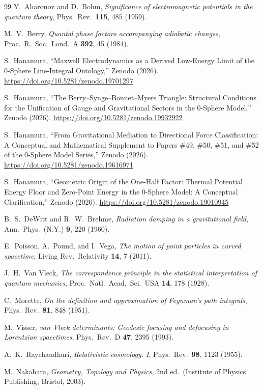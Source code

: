\documentclass[%
 reprint, amsmath,amssymb, aps, prb, ]{revtex4-2}
\numberwithin{equation}{section}
\begin{document}
\begin{thebibliography}{99}
 Y.~Aharonov and D.~Bohm, \textit{Significance of electromagnetic potentials in the quantum theory}, Phys.\ Rev.\ \textbf{115}, 485 (1959).

 M.~V.~Berry, \textit{Quantal phase factors accompanying adiabatic changes}, Proc.\ R.\ Soc.\ Lond.\ A \textbf{392}, 45 (1984).

S.~Hanamura,
``Maxwell Electrodynamics as a Derived Low-Energy Limit of the 0-Sphere Line-Integral Ontology,''
Zenodo (2026).
\href{https://doi.org/10.5281/zenodo.19701297}{https://doi.org/10.5281/zenodo.19701297}

S.~Hanamura,
``The Berry--Synge--Bonnet--Myers Triangle: Structural Conditions for the Unification of Gauge and Gravitational Sectors in the 0-Sphere Model,''
Zenodo (2026).
\href{https://doi.org/10.5281/zenodo.19932922}{https://doi.org/10.5281/zenodo.19932922}

S.~Hanamura,
``From Gravitational Mediation to Directional Force Classification: A Conceptual and Mathematical Supplement to Papers \#49, \#50, \#51, and \#52 of the 0-Sphere Model Series,''
Zenodo (2026).
\href{https://doi.org/10.5281/zenodo.19616971}{https://doi.org/10.5281/zenodo.19616971}

S.~Hanamura,
``Geometric Origin of the One-Half Factor: Thermal Potential Energy Floor and Zero-Point Energy in the 0-Sphere Model: A Conceptual Clarification,''
Zenodo (2026).
\href{https://doi.org/10.5281/zenodo.19010945}{https://doi.org/10.5281/zenodo.19010945}

 B.~S.~DeWitt and R.~W.~Brehme, \textit{Radiation damping in a gravitational field}, Ann.\ Phys.\ (N.Y.) \textbf{9}, 220 (1960).

 E.~Poisson, A.~Pound, and I.~Vega, \textit{The motion of point particles in curved spacetime}, Living Rev.\ Relativity \textbf{14}, 7 (2011).

 J.~H.~Van Vleck, \textit{The correspondence principle in the statistical interpretation of quantum mechanics}, Proc.\ Natl.\ Acad.\ Sci.\ USA \textbf{14}, 178 (1928).

 C.~Morette, \textit{On the definition and approximation of Feynman's path integrals}, Phys.\ Rev.\ \textbf{81}, 848 (1951).

 M.~Visser, \textit{van Vleck determinants: Geodesic focusing and defocusing in Lorentzian spacetimes}, Phys.\ Rev.\ D \textbf{47}, 2395 (1993).

 A.~K.~Raychaudhuri, \textit{Relativistic cosmology. I}, Phys.\ Rev.\ \textbf{98}, 1123 (1955).

 M.~Nakahara, \textit{Geometry, Topology and Physics}, 2nd ed.\ (Institute of Physics Publishing, Bristol, 2003).

\end{thebibliography}

\end{document}
